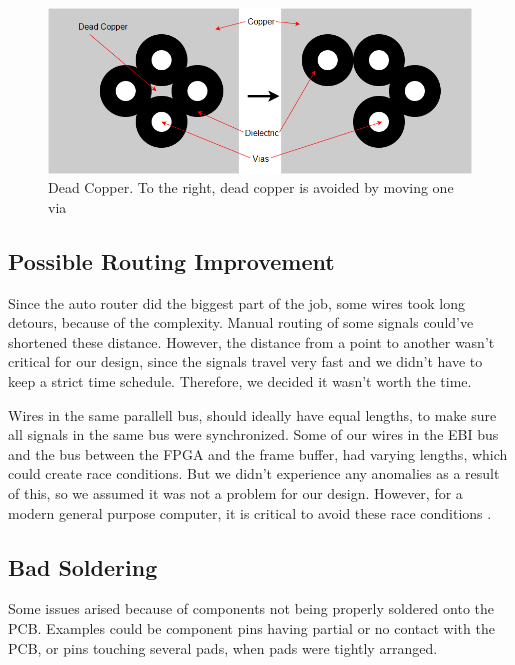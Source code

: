 \begin{figure}[h!]
\centering
\includegraphics[scale = 0.4]{images/Dead_Copper.png}
\caption{Dead Copper. To the right, dead copper is avoided by moving one via}
\label{fig:Dead copper}
\end{figure}

\subsection{Possible Routing Improvement}
Since the auto router did the biggest part of the job, some wires took long detours, because of the complexity. Manual routing of some signals could've shortened these distance. However, the distance from a point to another wasn't critical for our design, since the signals travel very fast and we didn't have to keep a strict time schedule. Therefore, we decided it wasn't worth the time.

Wires in the same parallell bus, should ideally have equal lengths, to make sure all signals in the same bus were synchronized. Some of our wires in the EBI bus and the bus between the FPGA and the frame buffer, had varying lengths, which could create race conditions. But we didn't experience any anomalies as a result of this, so we assumed it was not a problem for our design. However, for a modern general purpose computer, it is critical to avoid these race conditions \cite{race-conditions}.

\subsection{Bad Soldering}
Some issues arised because of components not being properly soldered onto the PCB. Examples could be component pins having partial or no contact with the PCB, or pins touching several pads, when pads were tightly arranged.

